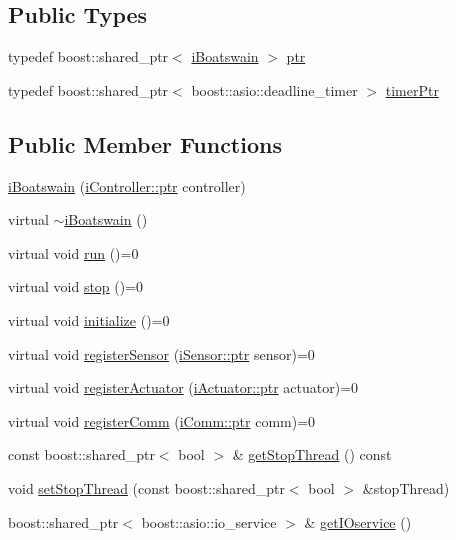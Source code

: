 \subsection*{Public Types}
\begin{DoxyCompactItemize}
\item 
typedef boost\+::shared\+\_\+ptr$<$ \hyperlink{classo_cpt_1_1i_boatswain}{i\+Boatswain} $>$ \hyperlink{classo_cpt_1_1i_boatswain_ad5e2819c6252955a7eddba4a4c980e3c}{ptr}
\item 
typedef boost\+::shared\+\_\+ptr$<$ boost\+::asio\+::deadline\+\_\+timer $>$ \hyperlink{classo_cpt_1_1i_boatswain_ac42d91dd3964880be9475ccaab4231cd}{timer\+Ptr}
\end{DoxyCompactItemize}
\subsection*{Public Member Functions}
\begin{DoxyCompactItemize}
\item 
\hyperlink{classo_cpt_1_1i_boatswain_a9424746b673744868f521b7a34a1064a}{i\+Boatswain} (\hyperlink{classo_cpt_1_1i_controller_a6d89a95cd6ad68bb74adfaca2f36370f}{i\+Controller\+::ptr} controller)
\item 
virtual \hyperlink{classo_cpt_1_1i_boatswain_a0577a8228f2a93e07ef21e22e9c17bde}{$\sim$i\+Boatswain} ()
\item 
virtual void \hyperlink{classo_cpt_1_1i_boatswain_a4512e742ba996b32dcc452d9f180724a}{run} ()=0
\item 
virtual void \hyperlink{classo_cpt_1_1i_boatswain_ad1fb6362c814a72ea6c4dc9a9042cf5e}{stop} ()=0
\item 
virtual void \hyperlink{classo_cpt_1_1i_boatswain_a0749ff59de42e7a8a47586ab9d9ac98f}{initialize} ()=0
\item 
virtual void \hyperlink{classo_cpt_1_1i_boatswain_aa9f9014202617a705d7ce21db2877222}{register\+Sensor} (\hyperlink{classo_cpt_1_1i_sensor_a03533d2c5dc66e332d70dbb3b5e3006a}{i\+Sensor\+::ptr} sensor)=0
\item 
virtual void \hyperlink{classo_cpt_1_1i_boatswain_a7915584ee17a28b1fc506a8968e27387}{register\+Actuator} (\hyperlink{classo_cpt_1_1i_actuator_a35847799558e92bb84fb6c71de772cac}{i\+Actuator\+::ptr} actuator)=0
\item 
virtual void \hyperlink{classo_cpt_1_1i_boatswain_aebae826c7516c1688e94d84de5606cac}{register\+Comm} (\hyperlink{classo_cpt_1_1i_comm_af0c655f143251b7d03fcd98f89637228}{i\+Comm\+::ptr} comm)=0
\item 
const boost\+::shared\+\_\+ptr$<$ bool $>$ \& \hyperlink{classo_cpt_1_1i_boatswain_a221a6db0e2eeb10f77c2e512bbe94052}{get\+Stop\+Thread} () const 
\item 
void \hyperlink{classo_cpt_1_1i_boatswain_ac4c9a286c90132944dfab6df31900fc3}{set\+Stop\+Thread} (const boost\+::shared\+\_\+ptr$<$ bool $>$ \&stop\+Thread)
\item 
boost\+::shared\+\_\+ptr$<$ boost\+::asio\+::io\+\_\+service $>$ \& \hyperlink{classo_cpt_1_1i_boatswain_aa064a9b107c71e71b25c5cbd4957e804}{get\+I\+Oservice} ()
\end{DoxyCompactItemize}
